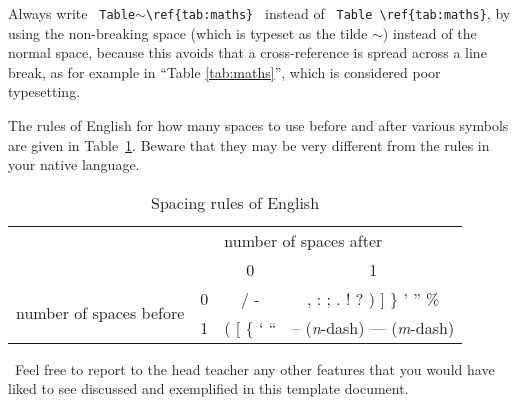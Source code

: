 Always write
%
\verb| Table|$\sim$\verb|\ref{tab:maths} |
%
instead of
%
\verb| Table \ref{tab:maths}|,
%
by using the non-breaking space (which is typeset as the tilde $\sim$)
instead of the normal space, because this avoids that a
cross-reference is spread across a line break, as for example in
``Table \ref{tab:maths}'', which is considered poor typesetting.

The rules of English for how many spaces to use before and after
various symbols are given in Table~\ref{tab:spacing}.  Beware that
they may be very different from the rules in your native language.

\begin{table}[t]
  \centering
  \begin{tabular}{cc|c|c}
    \toprule
    \multicolumn{2}{c}{} & \multicolumn{2}{l}{number of spaces after} \\
    \cmidrule{3-4}
    \multicolumn{2}{c}{} & 0 & 1 \\
    \midrule
    \multirow{2}{*}{number of spaces before} & 0 & / - & , : ; . ! ?
    ) ] \} ' '' \% \\
    \cmidrule{2-4}
    & 1 & ( [ \{ ` `` & -- (\emph{n}-dash) --- (\emph{m}-dash) \\
    \bottomrule
  \end{tabular}
  \caption{Spacing rules of English}
  \label{tab:spacing}
\end{table}

\vfill

\noindent
\handpoint\ Feel free to report to the head teacher any other features
that you would have liked to see discussed and exemplified in this
template document.
